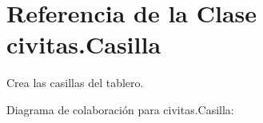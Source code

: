 \hypertarget{classcivitas_1_1Casilla}{}\section{Referencia de la Clase civitas.\+Casilla}
\label{classcivitas_1_1Casilla}


Crea las casillas del tablero.  




Diagrama de colaboración para civitas.\+Casilla\+:
